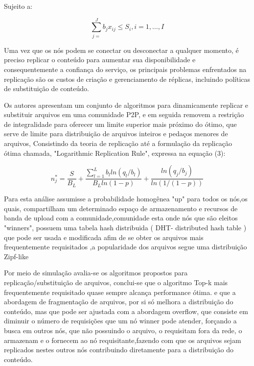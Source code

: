 \documentclass[
	12pt,				%
	oneside,			%
	a4paper,			%
	english,			%
	brazil				%
	]{abntex2ppgsi}
\begin{document}
Sujeito a:

\begin{equation}
\sum_{j=}^{J}b_jx_{ij}\leq S_i, i=1,\dots,I
\end{equation}
\newline

Uma vez que os nós podem se conectar ou desconectar a qualquer momento, é preciso replicar o conteúdo para aumentar sua disponibilidade e consequentemente a confiança do serviço, os principais problemas enfrentados na replicação são os custos de criação e gerenciamento de réplicas, incluindo políticas de substituição de conteúdo.

Os autores apresentam um conjunto de algoritmos para dinamicamente replicar e substituir arquivos em uma comunidade P2P, e em seguida removem a restrição de integralidade para oferecer um limite superior mais próximo do ótimo, que serve de limite para distribuição de arquivos inteiros e pedaços menores de arquivos,  Consistindo da teoria de replicação até a formulação da replicação ótima chamada, "Logarithmic Replication Rule", expressa na equação (3):

\begin{equation}
n_j^{*} = \frac{S}{B_L}+\frac{\sum_{l=1}^{L}b_lln(q_l/b_l)}{B_Lln(1-p)}+\frac{ln(q_j/b_j)}{ln(1/(1-p))}
\end{equation}

Para esta análise assumisse a probabilidade homogênea "up" para todos os nós,os quais, compartilham um determinado espaço de armazenamento e recursos de banda de upload com a comunidade,comunidade esta onde nós que são eleitos "winners", possuem uma tabela hash distribuida ( DHT- distributed hash table ) que pode ser usada e modificada afim de se obter os arquivos mais frequentemente requisitados ,a popularidade dos arquivos segue uma distribuição Zipf-like

Por meio de simulação avalia-se os algoritmos propostos para replicação/substituição de arquivos, conclui-se que o algoritmo Top-k mais frequentemente requisitado quase sempre alcança performance ótima. e que a abordagem de fragmentação de arquivos, por si só melhora a distribuição do conteúdo, mas que pode ser ajustada com a abordagem overflow, que consiste em diminuir o número de requisições que um nó winner pode atender, forçando a busca em outros nós, que não possuindo o arquivo, o requisitam fora da rede, o armazenam e o fornecem ao nó requisitante,fazendo com que os arquivos sejam replicados nestes outros nós contribuindo diretamente para a distribuição do conteúdo.
\end{document}
